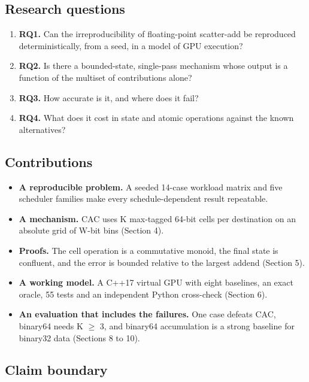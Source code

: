 \documentclass[3p,10pt]{elsarticle}
\begin{document}
\hypertarget{research-questions}{%
\subsection{Research questions}\label{research-questions}}

\begin{enumerate}
\def\labelenumi{\arabic{enumi}.}
\item
  \textbf{RQ1.} Can the irreproducibility of floating-point scatter-add
  be reproduced deterministically, from a seed, in a model of GPU
  execution?
\item
  \textbf{RQ2.} Is there a bounded-state, single-pass mechanism whose
  output is a function of the multiset of contributions alone?
\item
  \textbf{RQ3.} How accurate is it, and where does it fail?
\item
  \textbf{RQ4.} What does it cost in state and atomic operations against
  the known alternatives?
\end{enumerate}

\hypertarget{contributions}{%
\subsection{Contributions}\label{contributions}}

\begin{itemize}
\item
  \textbf{A reproducible problem.} A seeded 14-case workload matrix and
  five scheduler families make every schedule-dependent result
  repeatable.
\item
  \textbf{A mechanism.} CAC uses K max-tagged 64-bit cells per
  destination on an absolute grid of W-bit bins (Section 4).
\item
  \textbf{Proofs.} The cell operation is a commutative monoid, the final
  state is confluent, and the error is bounded relative to the largest
  addend (Section 5).
\item
  \textbf{A working model.} A C++17 virtual GPU with eight baselines, an
  exact oracle, 55 tests and an independent Python cross-check (Section
  6).
\item
  \textbf{An evaluation that includes the failures.} One case defeats
  CAC, binary64 needs K $\geq$ 3, and binary64 accumulation is a strong
  baseline for binary32 data (Sections 8 to 10).
\end{itemize}

\hypertarget{claim-boundary}{%
\subsection{Claim boundary}\label{claim-boundary}}
\end{document}
